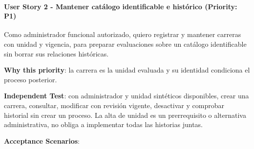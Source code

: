 \documentclass[11pt,a4paper]{article}
\begin{document}
\paragraph{User Story 2 - Mantener catálogo identificable e histórico
(Priority:
P1)}\label{user-story-2---mantener-catuxe1logo-identificable-e-histuxf3rico-priority-p1}

Como administrador funcional autorizado, quiero registrar y mantener
carreras con unidad y vigencia, para preparar evaluaciones sobre un
catálogo identificable sin borrar sus relaciones históricas.

\textbf{Why this priority}: la carrera es la unidad evaluada y su
identidad condiciona el proceso posterior.

\textbf{Independent Test}: con administrador y unidad sintéticos
disponibles, crear una carrera, consultar, modificar con revisión
vigente, desactivar y comprobar historial sin crear un proceso. La alta
de unidad es un prerrequisito o alternativa administrativa, no obliga a
implementar todas las historias juntas.

\textbf{Acceptance Scenarios}:
\end{document}
